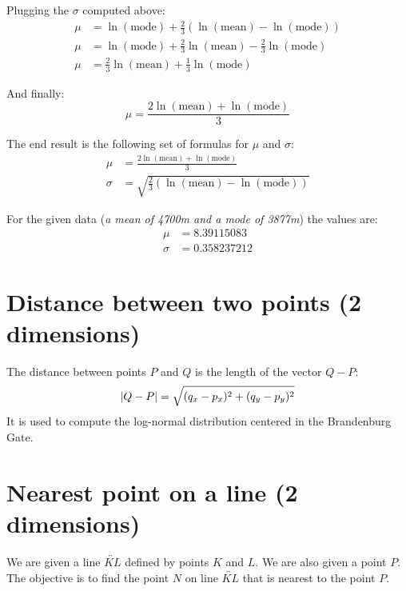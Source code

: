 \documentclass[a4paper,12pt]{article}
\begin{document}
Plugging the \(\sigma\) computed above:
\begin{align*}
  \mu &= \ln(\mbox{mode}) + \frac{2}{3}\left(\ln(\mbox{mean}) - \ln(\mbox{mode})\right)\\
  \mu &= \ln(\mbox{mode}) + \frac{2}{3}\ln(\mbox{mean}) - \frac{2}{3}\ln(\mbox{mode})\\
  \mu &= \frac{2}{3}\ln(\mbox{mean}) + \frac{1}{3}\ln(\mbox{mode})
\end{align*}

And finally:
\[\mu = \frac{2\ln(\mbox{mean}) + \ln(\mbox{mode})}{3}\tag{\(\mu\)}\]

The end result is the following set of formulas for \(\mu\) and \(\sigma\):
\begin{align*}
  \mu &= \frac{2\ln(\mbox{mean}) + \ln(\mbox{mode})}{3}\tag{\(\mu\)}\\
  \sigma &= \sqrt{\frac{2}{3}\left(\ln(\mbox{mean}) - \ln(\mbox{mode})\right)\tag{\(\sigma\)}}
\end{align*}

For the given data (\emph{a mean of 4700m and a mode of 3877m}) the values are:
\begin{align*}
  \mu &= 8.39115083\\
  \sigma &= 0.358237212
\end{align*}


\section{Distance between two points (2 dimensions)}

The distance between points \(P\) and \(Q\) is the length of the vector \(Q - P\):
\[\abs{Q - P} = \sqrt{(q_x - p_x)^2 + (q_y - p_y)^2}\]
It is used to compute the log-normal distribution centered in the Brandenburg Gate.


\section{Nearest point on a line (2 dimensions)}

We are given a line \(\overleftrightarrow{KL}\) defined by points \(K\) and \(L\).
We are also given a point \(P\).
The objective is to find the point \(N\) on line \(\overleftrightarrow{KL}\)
that is nearest to the point \(P\).
\end{document}
